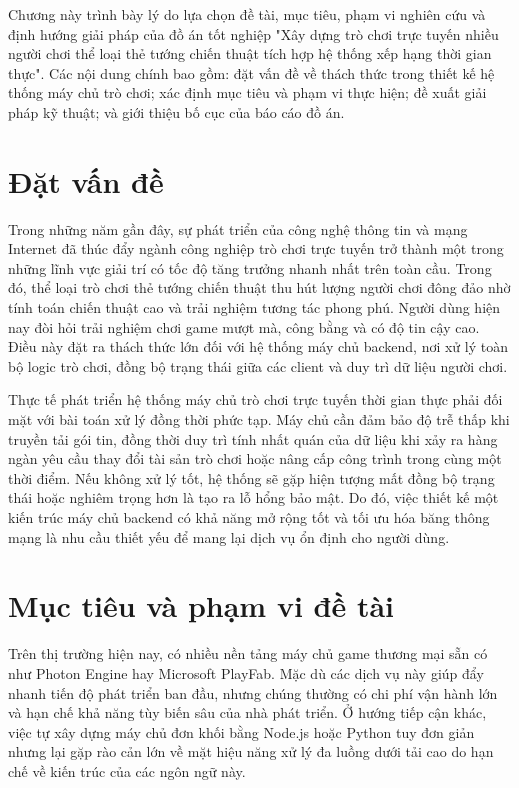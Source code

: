 \documentclass[../Project.tex]{subfiles}
\begin{document}
Chương này trình bày lý do lựa chọn đề tài, mục tiêu, phạm vi nghiên cứu và định hướng giải pháp của đồ án tốt nghiệp "Xây dựng trò chơi trực tuyến nhiều người chơi thể loại thẻ tướng chiến thuật tích hợp hệ thống xếp hạng thời gian thực". Các nội dung chính bao gồm: đặt vấn đề về thách thức trong thiết kế hệ thống máy chủ trò chơi; xác định mục tiêu và phạm vi thực hiện; đề xuất giải pháp kỹ thuật; và giới thiệu bố cục của báo cáo đồ án.

\section{Đặt vấn đề}
Trong những năm gần đây, sự phát triển của công nghệ thông tin và mạng Internet đã thúc đẩy ngành công nghiệp trò chơi trực tuyến trở thành một trong những lĩnh vực giải trí có tốc độ tăng trưởng nhanh nhất trên toàn cầu. Trong đó, thể loại trò chơi thẻ tướng chiến thuật thu hút lượng người chơi đông đảo nhờ tính toán chiến thuật cao và trải nghiệm tương tác phong phú. Người dùng hiện nay đòi hỏi trải nghiệm chơi game mượt mà, công bằng và có độ tin cậy cao. Điều này đặt ra thách thức lớn đối với hệ thống máy chủ backend, nơi xử lý toàn bộ logic trò chơi, đồng bộ trạng thái giữa các client và duy trì dữ liệu người chơi.

Thực tế phát triển hệ thống máy chủ trò chơi trực tuyến thời gian thực phải đối mặt với bài toán xử lý đồng thời phức tạp. Máy chủ cần đảm bảo độ trễ thấp khi truyền tải gói tin, đồng thời duy trì tính nhất quán của dữ liệu khi xảy ra hàng ngàn yêu cầu thay đổi tài sản trò chơi hoặc nâng cấp công trình trong cùng một thời điểm. Nếu không xử lý tốt, hệ thống sẽ gặp hiện tượng mất đồng bộ trạng thái hoặc nghiêm trọng hơn là tạo ra lỗ hổng bảo mật. Do đó, việc thiết kế một kiến trúc máy chủ backend có khả năng mở rộng tốt và tối ưu hóa băng thông mạng là nhu cầu thiết yếu để mang lại dịch vụ ổn định cho người dùng.

\section{Mục tiêu và phạm vi đề tài}
Trên thị trường hiện nay, có nhiều nền tảng máy chủ game thương mại sẵn có như Photon Engine hay Microsoft PlayFab. Mặc dù các dịch vụ này giúp đẩy nhanh tiến độ phát triển ban đầu, nhưng chúng thường có chi phí vận hành lớn và hạn chế khả năng tùy biến sâu của nhà phát triển. Ở hướng tiếp cận khác, việc tự xây dựng máy chủ đơn khối bằng Node.js hoặc Python tuy đơn giản nhưng lại gặp rào cản lớn về mặt hiệu năng xử lý đa luồng dưới tải cao do hạn chế về kiến trúc của các ngôn ngữ này.
\end{document}
